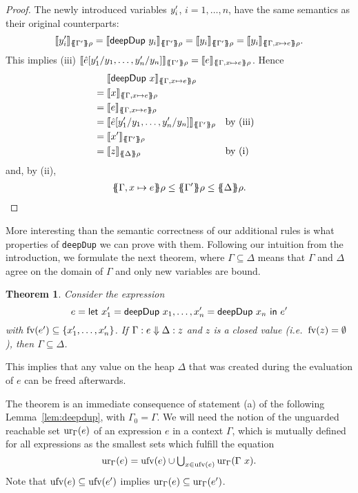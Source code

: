 \documentclass[preprint]{sigplanconf}
\newtheorem{theorem}{Theorem}
\theoremstyle{nonumberplain}
\newtheorem{proof}{Proof}
\newcommand{\li}{\lstinline[style=Haskell]}
\begin{document}
\begin{proof}
The newly introduced variables $y'_i$, $i=1,\ldots,n$, have the same semantics as their original counterparts:
\[
\dsem{\fresh y_i}{\esem{\Gamma'}\rho}
= \dsem{\sDeepDup {y_i}}{\esem{\Gamma'}\rho}
= \dsem{y_i}{\esem{\Gamma'}\rho}
= \dsem{y_i}{\esem{\Gamma, x\mapsto e}\rho}.
\]
This implies (iii) $\dsem{\hat e[\fresh y_1/y_1,\ldots,\fresh y_n/y_n]}{\esem{\Gamma'}\rho} = \dsem{e}{\esem{\Gamma, x\mapsto e}\rho}$. Hence
{\allowdisplaybreaks[1]
\begin{align*}
&\phantom{{}={}}\dsem{\sDeepDup x}{\esem{\Gamma, x\mapsto e}\rho}\\
&= \dsem{x}{\esem{\Gamma, x\mapsto e}\rho}\\
&= \dsem{e}{\esem{\Gamma, x\mapsto e}\rho}\\
&= \dsem{\hat e[\fresh y_1/y_1,\ldots,\fresh y_n/y_n]}{\esem{\Gamma'}\rho} &&\text{by (iii)}\\
&= \dsem{\fresh x}{\esem{\Gamma'}\rho}\\
&= \dsem{z}{\esem \Delta \rho} &&\text{by (i)}
\end{align*}
}
and, by (ii),
\begin{align*}
\esem{\Gamma, x\mapsto e}\rho \le \esem{\Gamma'} \rho \le \esem{\Delta}\rho.
\end{align*}
\end{proof}

More interesting than the semantic correctness of our additional rules is what properties of \li-deepDup- we can prove with them. Following our intuition from the introduction, we formulate the next theorem, where $\Gamma \subseteq \Delta$ means that $\Gamma$ and $\Delta$ agree on the domain of $\Gamma$ and only new variables are bound.

\begin{theorem}
Consider the expression
\[
e=\text{\textsf{let}}\ x_1' = \text{\textsf{deepDup}}\ x_1,\ldots,x_n'= \text{\textsf{deepDup}}\ x_n\ \text{\textsf{in}}\ e'
\]
with $\text{fv}(e') \subseteq \{x_1',\ldots,x_n'\}$. If $\Gamma : e \Downarrow \Delta : z$ and $z$ is a closed value (i.e.\ $\text{fv}(z) = \emptyset$), then $\Gamma \subseteq \Delta$.
\label{thm:deepdup}
\end{theorem}
This implies that any value on the heap $\Delta$ that was created during the evaluation of $e$ can be freed afterwards.

The theorem is an immediate consequence of statement (a) of the following Lemma~\ref{lem:deepdup}, with $\Gamma_0 = \Gamma$. We will need the notion of the unguarded reachable set $\text{ur}_{\Gamma}(e)$ of an expression $e$ in a context $\Gamma$, which is mutually defined for all expressions as the smallest sets which fulfill the equation
\[
\text{ur}_{\Gamma}(e) = \text{ufv}(e) \cup \textstyle\bigcup_{x\in \text{ufv}(e)}\text{ur}_{\Gamma}(\Gamma\ x).
\]
Note that $\text{ufv}(e) \subseteq \text{ufv}(e')$ implies $\text{ur}_{\Gamma}(e) \subseteq \text{ur}_{\Gamma}(e')$. %
\end{document}
